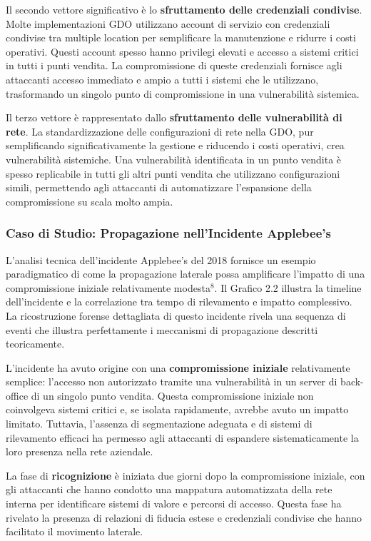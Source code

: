 {Il secondo vettore significativo è lo \textbf{sfruttamento delle credenziali condivise}. Molte implementazioni GDO utilizzano account di servizio con credenziali condivise tra multiple location per semplificare la manutenzione e ridurre i costi operativi. Questi account spesso hanno privilegi elevati e accesso a sistemi critici in tutti i punti vendita. La compromissione di queste credenziali fornisce agli attaccanti accesso immediato e ampio a tutti i sistemi che le utilizzano, trasformando un singolo punto di compromissione in una vulnerabilità sistemica.

Il terzo vettore è rappresentato dallo \textbf{sfruttamento delle vulnerabilità di rete}. La standardizzazione delle configurazioni di rete nella GDO, pur semplificando significativamente la gestione e riducendo i costi operativi, crea vulnerabilità sistemiche. Una vulnerabilità identificata in un punto vendita è spesso replicabile in tutti gli altri punti vendita che utilizzano configurazioni simili, permettendo agli attaccanti di automatizzare l'espansione della compromissione su scala molto ampia.

\subsubsection{Caso di Studio: Propagazione nell'Incidente Applebee's}

L'analisi tecnica dell'incidente Applebee's del 2018 fornisce un esempio paradigmatico di come la propagazione laterale possa amplificare l'impatto di una compromissione iniziale relativamente modesta$^{8}$. Il Grafico 2.2 illustra la timeline dell'incidente e la correlazione tra tempo di rilevamento e impatto complessivo. La ricostruzione forense dettagliata di questo incidente rivela una sequenza di eventi che illustra perfettamente i meccanismi di propagazione descritti teoricamente.

L'incidente ha avuto origine con una \textbf{compromissione iniziale} relativamente semplice: l'accesso non autorizzato tramite una vulnerabilità in un server di back-office di un singolo punto vendita. Questa compromissione iniziale non coinvolgeva sistemi critici e, se isolata rapidamente, avrebbe avuto un impatto limitato. Tuttavia, l'assenza di segmentazione adeguata e di sistemi di rilevamento efficaci ha permesso agli attaccanti di espandere sistematicamente la loro presenza nella rete aziendale.

La fase di \textbf{ricognizione} è iniziata due giorni dopo la compromissione iniziale, con gli attaccanti che hanno condotto una mappatura automatizzata della rete interna per identificare sistemi di valore e percorsi di accesso. Questa fase ha rivelato la presenza di relazioni di fiducia estese e credenziali condivise che hanno facilitato il movimento laterale.

}
